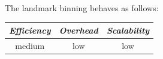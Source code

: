 %
%
%
%
The landmark binning behaves as follows:
\begin{center}
{\footnotesize
\begin{tabular}{ccc}
\emph{Efficiency} & \emph{Overhead} & \emph{Scalability} \\
\hline
medium &
low &
low
\end{tabular}
}
\end{center}

